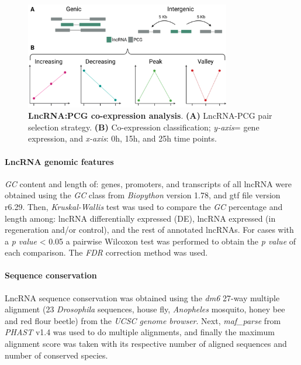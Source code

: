 \begin{figure}[!htb]
  \centering
  \includegraphics[width=0.8\textwidth]{img/methods/regeneration/co-expression.png}
  \caption[LncRNA:PCG co-expression analysis]{\textbf{LncRNA:PCG co-expression analysis}. \textbf{(A)} LncRNA-PCG pair selection strategy. \textbf{(B)} Co-expression classification; \textit{y-axis}= gene expression, and \textit{x-axis}: 0h, 15h, and 25h time points.}
  \label{fig:co-expression}
\end{figure}

\paragraph{LncRNA genomic features}
\label{sec:Genomic characterization}

\textit{GC} content and length of: genes, promoters, and transcripts of all lncRNA were obtained using the \textit{GC} class from \textit{Biopython}\autocite{cock_2009} version 1.78, and gtf file version r6.29. Then, \textit{Kruskal-Wallis} test was used to compare the \textit{GC} percentage and length among: lncRNA differentially expressed (DE), lncRNA expressed (in regeneration and/or control), and the rest of annotated lncRNAs. For cases with a \textit{p value} < 0.05 a pairwise Wilcoxon test was performed to obtain the \textit{p value} of each comparison. The \textit{FDR} correction method was used.

\paragraph{Sequence conservation}
\label{sec:Sequence_conservation}

LncRNA sequence conservation was obtained using the \textit{dm6} 27-way multiple alignment (23 \textit{Drosophila} sequences, house fly, \textit{Anopheles} mosquito, honey bee and red flour beetle) from the \textit{UCSC genome browser}.\autocite{tyner_2017_ucsc} Next, \textit{maf\_parse} from \textit{PHAST} \autocite{hubisz_2011_phast} v1.4 was used to do multiple alignments, and finally the maximum alignment score was taken with its respective number of aligned sequences and number of conserved species.

